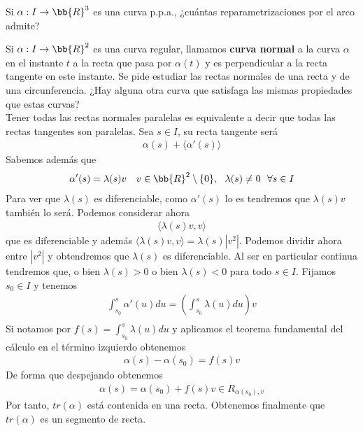 \begin{ejercicio}
    Si $\alpha : I \to \bb{R}^3$ es una curva p.p.a., ¿cuántas reparametrizaciones por el arco admite?
\end{ejercicio}

\begin{ejercicio}
    Si $\alpha : I \to \bb{R}^2$ es una curva regular, llamamos \textbf{curva normal} a la curva $\alpha$ en el instante $t$ a la recta que pasa por $\alpha(t)$ y es perpendicular a la recta tangente en este instante. Se pide estudiar las rectas normales de una recta y de una circunferencia. ¿Hay alguna otra curva que satisfaga las mismas propiedades que estas curvas?\\

    Tener todas las rectas normales paralelas es equivalente a decir que todas las rectas tangentes son paralelas. Sea $s\in I$, su recta tangente será 
    \begin{gather*}
        \alpha(s) + \langle \alpha'(s) \rangle
    \end{gather*}
    Sabemos además que 
    \begin{gather*}
        \alpha'(s) = \lambda(s)v\ \ \ v\in \bb{R}^2\setminus\{0\},\ \ \lambda(s)\neq 0 \ \ \forall s \in I
    \end{gather*}
    Para ver que $\lambda(s)$ es diferenciable, como $\alpha'(s)$ lo es tendremos que $\lambda(s)v$ también lo será. Podemos considerar ahora 
    \begin{gather*}
        \langle \lambda(s)v, v \rangle
    \end{gather*}
    que es diferenciable y además $\langle \lambda(s)v, v \rangle = \lambda(s)|v^2|$. Podemos dividir ahora entre $|v^2|$ y obtendremos que $\lambda(s)$ es diferenciable. Al ser en particular continua tendremos que, o bien $\lambda(s)>0$ o bien $\lambda(s)<0$ para todo $s\in I$. Fijamos $s_0\in I$ y tenemos
    \begin{gather*}
        \int_{s_0}^s \alpha'(u)du = \left(\int_{s_0}^s \lambda(u)du\right)v\\
    \end{gather*}
    Si notamos por $f(s)=\int_{s_0}^s \lambda(u)du$ y aplicamos el teorema fundamental del cálculo en el término izquierdo obtenemos
    \begin{gather*}
        \alpha(s)-\alpha(s_0) = f(s)v
    \end{gather*}
    De forma que despejando obtenemos
    \begin{gather*}
        \alpha(s) = \alpha(s_0) + f(s)v\in R_{\alpha(s_0),v}
    \end{gather*}
    Por tanto, $tr(\alpha)$ está contenida en una recta. Obtenemos finalmente que $tr(\alpha)$ es un segmento de recta.\\


\end{ejercicio}
